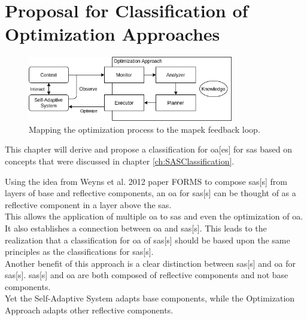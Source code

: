\section{Proposal for Classification of Optimization Approaches}
\label{ch:Proposal}

\begin{figure}[t]
    \centering
    \includegraphics[width=0.8\textwidth]{images/ClassificationProposal-OptimizationMAPEK_horizontal.png}
    \caption{Mapping the optimization process to the \acrshort{mapek} feedback loop.}
    \label{fig:MappingOptMAPEK}
\end{figure}

This chapter will derive and propose a classification for \acrlong{oa}[es] for \acrlong{sas}
based on concepts that were discussed in chapter \ref{ch:SASClassification}.

\noindent Using the idea from Weyns et al. 2012 paper FORMS \cite*{FORMS} to compose \acrlong{sas}[s] from
layers of base and reflective components, 
an \acrlong{oa} for \acrlong{sas}[s] can be thought of
as a reflective component in a layer above the \acrshort{sas}. \\
This allows the application of multiple \acrshort{oa} to \acrshort{sas} and even the 
optimization of \acrshort{oa}. \\
It also establishes a connection between \acrshort{oa} and \acrlong{sas}[s].
This leads to the realization that a classification for \acrshort{oa} of \acrlong{sas}[s]
should be based upon the same principles as the classifications for \acrlong{sas}[s]. \\
Another benefit of this approach is a clear distinction between \acrlong{sas}[s] and \acrshort{oa} for \acrlong{sas}[s].
\acrlong{sas}[s] and \acrshort{oa} are both composed of reflective components and not base components. \\
Yet the Self-Adaptive System adapts base components, while the Optimization Approach adapts other reflective components.


